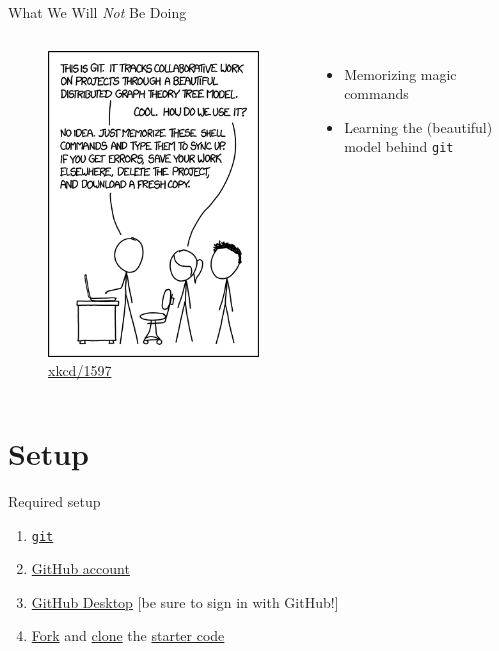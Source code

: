 \documentclass{beamer}
\theoremstyle{example}
\newcommand{\xkcd}[1]{\href{https://xkcd.com/#1}{xkcd/#1}}
\begin{document}
\begin{frame}{What We Will \emph{Not} Be Doing}
    \begin{columns}
        \begin{figure}
            \includegraphics[scale=0.4]{img/git}
            \caption{\xkcd{1597}}
        \end{figure}

        \begin{itemize}
            \item Memorizing magic commands
            \item Learning the (beautiful) model behind \texttt{git}
        \end{itemize}
    \end{columns}
\end{frame}

\section{Setup}
\begin{frame}[label=setup]{Required setup}
    \begin{enumerate}
        \item
            \href{https://git-scm.com/book/en/v2/Getting-Started-Installing-Git}
            {\texttt{git}}
        \item
            \href{https://github.com}
            {GitHub account}
        \item \href{https://desktop.github.com}
            {GitHub Desktop} [be sure to sign in with GitHub!]
        \item \href{https://github.com/benknoble/git-wizard-code/fork}{Fork}
            and
            \href{https://help.github.com/en/desktop/contributing-to-projects/cloning-a-repository-from-github-desktop}{clone}
            the
            \href{https://github.com/benknoble/git-wizard-code}{starter code}
    \end{enumerate}
\end{frame}
\end{document}
